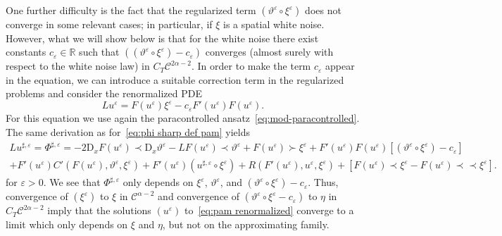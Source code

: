 \documentclass[11pt,a4paper]{article}
\newcommand{\mathD}{\mathrm{D}}
\newcommand{\precprec}{\prec\!\!\!\prec}
\theoremstyle{remark}
\newcommand{\CC}{\ensuremath{\mathscr{C}}}
\begin{document}
One further difficulty is the fact that the regularized term $(\vartheta^{\varepsilon} \circ \xi^{\varepsilon} )$ does not converge in some
relevant cases; in particular, if $\xi$ is a spatial white noise. However, what we will show below is that for the white noise  there
exist constants $c_{\varepsilon} \in \mathbb{R}$ such that $((\vartheta^{\varepsilon} \circ \xi^{\varepsilon} ) -c_{\varepsilon})$ converges (almost surely with respect to the white noise law)
in $C_{T} \CC^{2 \alpha -2}$. In order to make the term $c_{\varepsilon}$
appear in the equation, we can introduce a suitable correction term in the
regularized problems and consider the renormalized PDE
\begin{equation}\label{eq:pam renormalized}
   L u^{\varepsilon} =F ( u^{\varepsilon} ) \xi^{\varepsilon} -c_{\varepsilon} F' ( u^{\varepsilon} ) F ( u^{\varepsilon} ) .
\end{equation}
For this equation we use again the paracontrolled ansatz~\eqref{eq:mod-paracontrolled}. The same derivation as for~\eqref{eq:phi sharp def pam} yields
\begin{gather*}
   L u^{\sharp , \varepsilon} = \Phi^{\sharp , \varepsilon} =-2 \mathD_{x} F (u^{\varepsilon} ) \prec \mathD_{x} \vartheta^{\varepsilon} -L F ( u^{\varepsilon} ) \prec \vartheta^{\varepsilon} +F ( u^{\varepsilon} ) \succ \xi^{\varepsilon} +F' ( u^{\varepsilon} ) F ( u^{\varepsilon} )  [ (\vartheta^{\varepsilon} \circ \xi^{\varepsilon} ) -c_{\varepsilon} ] \\
   +F' ( u^{\varepsilon} ) C' ( F ( u^{\varepsilon} ) ,  \vartheta^{\varepsilon} , \xi^{\varepsilon} ) +F' ( u^{\varepsilon} )  ( u^{\sharp , \varepsilon} \circ \xi^{\varepsilon} ) +R ( F' ( u^{\varepsilon} ) ,u^{\varepsilon} , \xi^{\varepsilon} ) + [ F ( u^{\varepsilon} ) \prec \xi^{\varepsilon} -F ( u^{\varepsilon} ) \precprec \xi^{\varepsilon} ].
\end{gather*}
for $\varepsilon >0$. We see that $\Phi^{\sharp , \varepsilon}$ only depends on $\xi^{\varepsilon}$, $\vartheta^{\varepsilon}$, and $(\vartheta^{\varepsilon} \circ \xi^{\varepsilon} ) -c_{\varepsilon}$. Thus,
convergence of $(\xi^{\varepsilon})$ to $\xi$ in
$\CC^{\alpha -2}$ and convergence of $( \vartheta^{\varepsilon} \circ \xi^{\varepsilon} -c_{\varepsilon} )$ to $\eta$ in $C_{T} \CC^{2 \alpha -2}$ imply that the solutions $( u^{\varepsilon} )$ to~\eqref{eq:pam renormalized} converge to a limit which only depends on $\xi$ and $\eta$,
but not on the approximating family.
\end{document}
